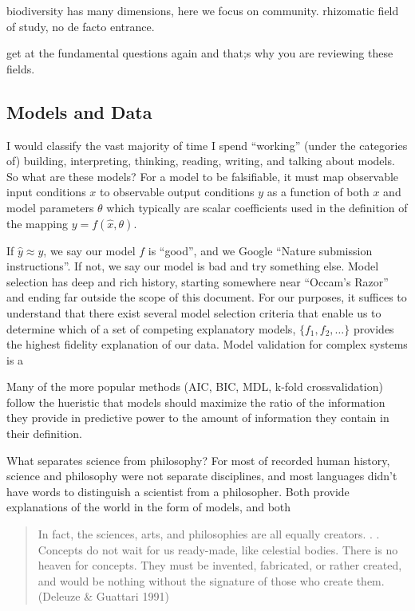 biodiversity has many dimensions, here we focus on community. rhizomatic
field of study, no de facto entrance.

get at the fundamental questions again and that;s why you are reviewing
these fields.

\hypertarget{models-and-data}{%
\subsection{Models and Data}\label{models-and-data}}

I would classify the vast majority of time I spend ``working'' (under
the categories of) building, interpreting, thinking, reading, writing,
and talking about models. So what are these models? For a model to be
falsifiable, it must map observable input conditions \(x\) to observable
output conditions \(y\) as a function of both \(x\) and model parameters
\(\theta\) which typically are scalar coefficients used in the
definition of the mapping \(y = f(\hat{x}, \theta)\).

If \(\hat{y} \approx y\), we say our model \(f\) is ``good'', and we
Google ``Nature submission instructions''. If not, we say our model is
bad and try something else. Model selection has deep and rich history,
starting somewhere near ``Occam's Razor'' and ending far outside the
scope of this document. For our purposes, it suffices to understand that
there exist several model selection criteria that enable us to determine
which of a set of competing explanatory models, \(\{f_1, f_2, \dots\}\)
provides the highest fidelity explanation of our data. Model validation
for complex systems is a

Many of the more popular methods (AIC, BIC, MDL, k-fold crossvalidation)
follow the hueristic that models should maximize the ratio of the
information they provide in predictive power to the amount of
information they contain in their definition.

What separates science from philosophy? For most of recorded human
history, science and philosophy were not separate disciplines, and most
languages didn't have words to distinguish a scientist from a
philosopher. Both provide explanations of the world in the form of
models, and both

\begin{quote}
In fact, the sciences, arts, and philosophies are all equally creators.
. . Concepts do not wait for us ready-made, like celestial bodies. There
is no heaven for concepts. They must be invented, fabricated, or rather
created, and would be nothing without the signature of those who create
them. (Deleuze \& Guattari 1991)
\end{quote}

